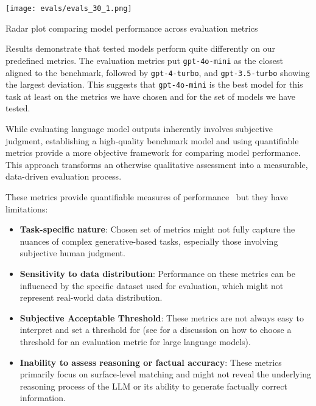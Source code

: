 \begin{marginfigure}
\centering
\texttt{[image: evals/evals\_30\_1.png]}
\caption{Radar plot comparing model performance across evaluation metrics}
\label{fig:model_comparison}
\end{marginfigure}

Results demonstrate that tested models perform quite differently on our predefined metrics. The evaluation metrics put \texttt{gpt-4o-mini} as the closest aligned to the benchmark, followed by \texttt{gpt-4-turbo}, and \texttt{gpt-3.5-turbo} showing the largest deviation. This suggests that \texttt{gpt-4o-mini} is the best model for this task at least on the metrics we have chosen and for the set of models we have tested.

While evaluating language model outputs inherently involves subjective judgment, establishing a high-quality benchmark model and using quantifiable metrics provide a more objective framework for comparing model performance. This approach transforms an otherwise qualitative assessment into a measurable, data-driven evaluation process.

These metrics provide quantifiable measures of performance~ but they have limitations:

\begin{itemize}
    \item \textbf{Task-specific nature}: Chosen set of metrics might not fully capture the nuances of complex generative-based tasks, especially those involving subjective human judgment.
    \item \textbf{Sensitivity to data distribution}: Performance on these metrics can be influenced by the specific dataset used for evaluation, which might not represent real-world data distribution.
    \item \textbf{Subjective Acceptable Threshold}: These metrics are not always easy to interpret and set a threshold for (see  for a discussion on how to choose a threshold for an evaluation metric for large language models).
    \item \textbf{Inability to assess reasoning or factual accuracy}: These metrics primarily focus on surface-level matching and might not reveal the underlying reasoning process of the LLM or its ability to generate factually correct information.
\end{itemize}


